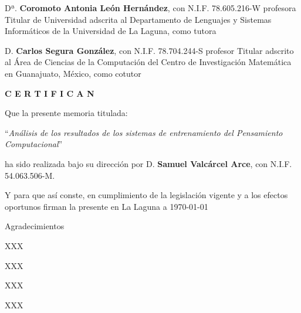 \documentclass[spanish,a4paper,14pt,oneside]{extreport}
\begin{document}
  Dª. {\bf Coromoto Antonia León Hernández}, con N.I.F. 78.605.216-W
  profesora
  Titular de Universidad
  adscrita al Departamento
  de Lenguajes y Sistemas Informáticos
  de la Universidad de La Laguna, como tutora
   
  \bigskip
  D. {\bf Carlos Segura González}, con N.I.F. 78.704.244-S
  profesor
  Titular
  adscrito al Área
  de Ciencias de la Computación
  del Centro de Investigación Matemática en Guanajuato, México, como cotutor
   
  \bigskip
  \bigskip
  {\bf C E R T I F I C A N}
   
  \bigskip
  \bigskip
  \bigskip
  Que la presente memoria titulada:
   
  \bigskip
  ``{\it Análisis de los resultados de los sistemas de entrenamiento del Pensamiento Computacional}''
   
  \bigskip
  \bigskip
  \bigskip
   
  \noindent ha sido realizada bajo su dirección por D. {\bf Samuel Valcárcel Arce},
  con N.I.F. 54.063.506-M.
   
  \bigskip
  \bigskip
   
  Y para que así conste, en cumplimiento de la legislación vigente y a los efectos
  oportunos firman la presente en La Laguna a \today
   
  \newpage
  \thispagestyle{empty}
   
  { \flushright
   
  \begin{LARGE}
  Agradecimientos
  \end{LARGE}
   
  \hspace{3mm}
   
  \begin{large}
   
   
  \hspace{3mm}
  XXX
   
  \hspace{3mm}
  XXX
   
   
  \hspace{3mm}
  XXX
   
   
  \hspace{3mm}
  XXX
   
   
  \end{large}
   
  }
   
  \newpage
   
\end{document}
